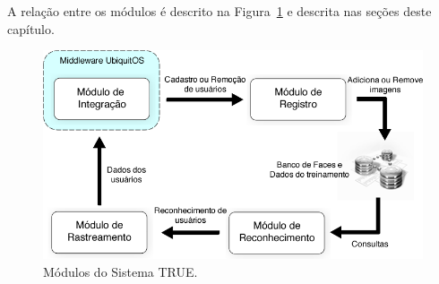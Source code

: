 A relação entre os módulos é descrito na Figura~\ref{fig:relacao-modulos} e descrita nas seções deste capítulo.

	\begin{figure}[htb]
			\begin{center}
				\includegraphics[scale=0.5]{figuras/4.ProblemaEProposta/modulo-integracao.png}
			\end{center}
			\caption{Módulos do Sistema TRUE.}
			\label{fig:relacao-modulos}
		\end{figure}








